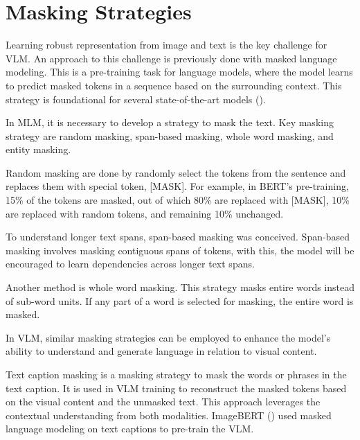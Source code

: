 
\section{Masking Strategies}
Learning robust representation from image and text is the key challenge for VLM. An approach to this challenge is previously done with masked language modeling. This is a pre-training task for language models, where the model learns to predict masked tokens in a sequence based on the surrounding context. This strategy is foundational for several state-of-the-art models (\cite{devlin2018bert, liu2020roberta}). 

In MLM, it is necessary to develop a strategy to mask the text. Key masking strategy are random masking, span-based masking, whole word masking, and entity masking. 

Random masking are done by randomly select the tokens from the sentence and replaces them with special token, [MASK]. For example, in BERT's pre-training, 15\% of the tokens are masked, out of which 80\% are replaced with [MASK], 10\% are replaced with random tokens, and remaining 10\% unchanged. 

To understand longer text spans, span-based masking was conceived. Span-based masking involves masking contiguous spans of tokens, with this, the model will be encouraged to learn dependencies across longer text spans. 

Another method is whole word masking. This strategy masks entire words instead of sub-word units. If any part of a word is selected for masking, the entire word is masked.

In VLM, similar masking strategies can be employed to enhance the model's ability to understand and generate language in relation to visual content.

Text caption masking is a masking strategy to mask the words or phrases in the text caption. It is used in VLM training to reconstruct the masked tokens based on the visual content and the unmasked text. This approach leverages the contextual understanding from both modalities. ImageBERT (\cite{qi2020imagebertcrossmodalpretraininglargescale}) used masked language modeling on text captions to pre-train the VLM.

